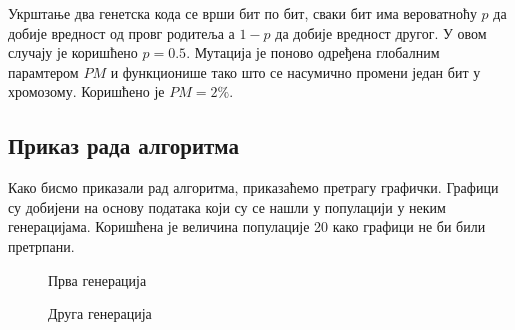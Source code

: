 \documentclass{article}
\begin{document}
Укрштање два генетска кода се врши бит по бит, сваки бит има вероватноћу  $p$
да добије вредност од провг родитеља а $1 - p$ да добије вредност другог. У овом
случају је коришћено $p = 0.5$. Мутација је поново одређена глобалним парамтером $PM$ 
и функционише тако што се насумично промени један бит у хромозому. Коришћено је 
$PM = 2\%$.


\subsection{Приказ рада алгоритма}
Како бисмо приказали рад алгоритма, приказаћемо претрагу графички. Графици су добијени на основу података
који су се нашли у популацији у неким генерацијама. Коришћена је величина популације 20 како графици не би били
претрпани.

\begin{figure}[H]
    \centering

    \caption{Прва генерација}
\end{figure}

\begin{figure}[H]
    \centering

    \caption{Друга генерација}
\end{figure}
\end{document}
